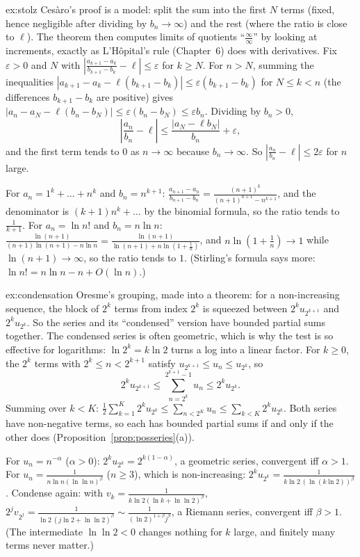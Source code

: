 \begin{solution}{ex:stolz}
\idea Ces\`aro's proof is a model: split the sum into the first $N$ terms (fixed, hence negligible after dividing by $b_n\to\infty$) and the rest (where the ratio is close to $\ell$). The theorem then computes limits of quotients ``$\frac\infty\infty$'' by looking at increments, exactly as L'H\^opital's rule (Chapter~6) does with derivatives.
\writeup Fix $\varepsilon>0$ and $N$ with $\left|\frac{a_{k+1}-a_k}{b_{k+1}-b_k}-\ell\right|\le\varepsilon$ for $k\ge N$. For $n>N$, summing the inequalities $|a_{k+1}-a_k-\ell(b_{k+1}-b_k)|\le\varepsilon(b_{k+1}-b_k)$ for $N\le k<n$ (the differences $b_{k+1}-b_k$ are positive) gives
$|a_n-a_N-\ell(b_n-b_N)|\le\varepsilon(b_n-b_N)\le\varepsilon b_n$. Dividing by $b_n>0$,
\[
\left|\frac{a_n}{b_n}-\ell\right|\le\frac{|a_N-\ell b_N|}{b_n}+\varepsilon,
\]
and the first term tends to $0$ as $n\to\infty$ because $b_n\to\infty$. So $\left|\frac{a_n}{b_n}-\ell\right|\le2\varepsilon$ for $n$ large.

For $a_n=1^k+\dots+n^k$ and $b_n=n^{k+1}$: $\frac{a_{n+1}-a_n}{b_{n+1}-b_n}=\frac{(n+1)^k}{(n+1)^{k+1}-n^{k+1}}$, and the denominator is $(k+1)n^k+\dots$ by the binomial formula, so the ratio tends to $\frac1{k+1}$.
For $a_n=\ln n!$ and $b_n=n\ln n$: $\frac{\ln(n+1)}{(n+1)\ln(n+1)-n\ln n}=\frac{\ln(n+1)}{\ln(n+1)+n\ln(1+\frac1n)}$, and $n\ln(1+\frac1n)\to1$ while $\ln(n+1)\to\infty$, so the ratio tends to $1$. (Stirling's formula says more: $\ln n!=n\ln n-n+O(\ln n)$.)
\end{solution}

\begin{solution}{ex:condensation}
\idea Oresme's grouping, made into a theorem: for a non-increasing sequence, the block of $2^k$ terms from index $2^k$ is squeezed between $2^ku_{2^{k+1}}$ and $2^ku_{2^k}$. So the series and its ``condensed'' version have bounded partial sums together. The condensed series is often geometric, which is why the test is so effective for logarithms: $\ln2^k=k\ln2$ turns a log into a linear factor.
\writeup For $k\ge0$, the $2^k$ terms with $2^k\le n<2^{k+1}$ satisfy $u_{2^{k+1}}\le u_n\le u_{2^k}$, so
\[
2^ku_{2^{k+1}}\le\sum_{n=2^k}^{2^{k+1}-1}u_n\le2^ku_{2^k}.
\]
Summing over $k<K$: $\frac12\sum_{k=1}^{K}2^ku_{2^k}\le\sum_{n<2^K}u_n\le\sum_{k<K}2^ku_{2^k}$. Both series have non-negative terms, so each has bounded partial sums if and only if the other does (Proposition~\ref{prop:posseries}(a)).

For $u_n=n^{-\alpha}$ ($\alpha>0$): $2^ku_{2^k}=2^{k(1-\alpha)}$, a geometric series, convergent iff $\alpha>1$.
For $u_n=\frac1{n\ln n(\ln\ln n)^\beta}$ ($n\ge3$), which is non-increasing: $2^ku_{2^k}=\frac1{k\ln2\,(\ln(k\ln2))^\beta}$. Condense again: with $v_k=\frac1{k\ln2(\ln k+\ln\ln2)^\beta}$, $2^jv_{2^j}=\frac1{\ln2\,(j\ln2+\ln\ln2)^\beta}\sim\frac{1}{(\ln2)^{1+\beta}j^\beta}$, a Riemann series, convergent iff $\beta>1$. (The intermediate $\ln\ln2<0$ changes nothing for $k$ large, and finitely many terms never matter.)
\end{solution}

